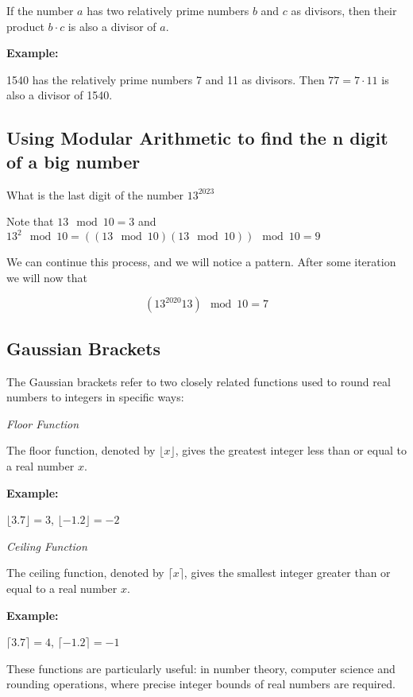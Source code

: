 If the number \( a \) has two relatively prime numbers \( b \) and \( c \) as divisors, then their product \( b \cdot c \) is also a divisor of \( a \). \\
\vspace{\baselineskip}

\textbf{Example:}
\vspace{\baselineskip}

1540 has the relatively prime numbers 7 and 11 as divisors. Then \( 77 = 7 \cdot 11 \) is also a divisor of 1540.

\subsection{Using Modular Arithmetic to find the n digit of a big number}

What is the last digit of the number \(13^{2023}\)

Note that \(13 \mod 10 = 3\) and  \(13^2 \mod 10 =  ((13 \mod 10)  (13\mod 10)) \mod 10 = 9 \)

We can continue this process, and we will notice a pattern. After some iteration we will now that

\[(13^{2020} 13) \mod 10 = 7\]

\subsection{Gaussian Brackets}

The Gaussian brackets refer to two closely related functions used to round real numbers to integers in specific ways:

\emph{Floor Function}
\vspace{\baselineskip}

The floor function, denoted by \(\lfloor x \rfloor\), gives the greatest integer less than or equal to a real number \(x\). \\
\vspace{\baselineskip}
    
\textbf{Example:}
\vspace{\baselineskip}
 
\(\lfloor 3.7 \rfloor = 3\), \(\lfloor -1.2 \rfloor = -2\)

\emph{Ceiling Function} 
    
The ceiling function, denoted by \(\lceil x \rceil\), gives the smallest integer greater than or equal to a real number \(x\). \\
\vspace{\baselineskip}

\textbf{Example:}
\vspace{\baselineskip}
 
\(\lceil 3.7 \rceil = 4\), \(\lceil -1.2 \rceil = -1\)
\vspace{\baselineskip}

These functions are particularly useful: in number theory, computer science 
and rounding operations, where precise integer bounds of real numbers are required.

